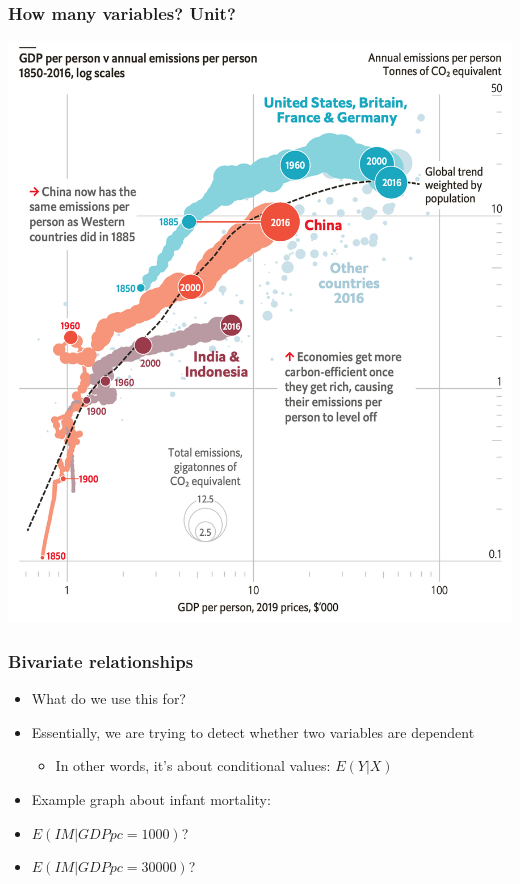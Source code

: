 \documentclass[aspectratio=43]{beamer}
\begin{document}
\begin{frame}
\frametitle{How many variables? Unit?}
\centering

\includegraphics[width = \textwidth]{../img/emissions}

\end{frame}

\begin{frame}
\frametitle{Bivariate relationships}
\centering

\begin{itemize}[<+->]
  \item<1-> What do we use this for?
  \item<2-> Essentially, we are trying to detect whether two variables are dependent
  \begin{itemize}
    \item In other words, it's about conditional values: $E(Y|X)$
  \end{itemize}
  \item<3-> Example graph about infant mortality:
  \item<3->[] $E(IM|GDPpc = 1000)$?
  \item<3->[] $E(IM|GDPpc = 30000)$?
\end{itemize}

\end{frame}
\end{document}
